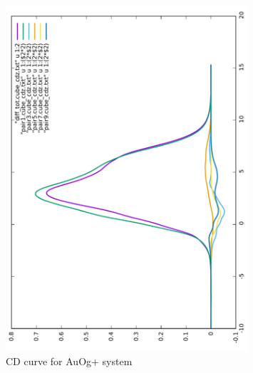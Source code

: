\documentclass[journal=inoraj,manuscript=article]{achemso}
\begin{document}
\begin{figure}[!h]
\includegraphics[angle=-90,width=0.80\textwidth]{./AuOg+/cd.pdf}
\caption{CD curve for AuOg+ system}
\end{figure}
\end{document}
